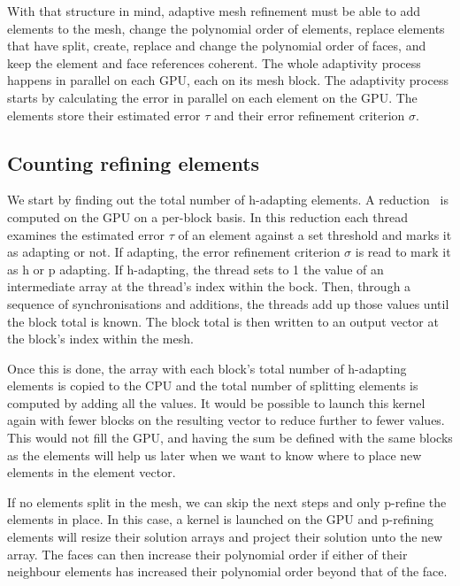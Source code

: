 With that structure in mind, adaptive mesh refinement must be able to add elements to the mesh,
change the polynomial order of elements, replace elements that have split, create, replace and
change the polynomial order of faces, and keep the element and face references coherent. The whole
adaptivity process happens in parallel on each GPU, each on its mesh block. The adaptivity process
starts by calculating the error in parallel on each element on the GPU. The elements store their
estimated error $\tau$ and their error refinement criterion $\sigma$.

\subsection{Counting refining elements} \label{subsection:adaptive_mesh_refinement:implementation:counting_refining_elements}


We start by finding out the total number of h-adapting elements. A reduction~\cite{Harris2007} is
computed on the GPU on a per-block basis. In this reduction each thread examines the estimated error
$\tau$ of an element against a set threshold and marks it as adapting or not. If adapting, the error
refinement criterion $\sigma$ is read to mark it as h or p adapting. If h-adapting, the thread sets
to 1 the value of an intermediate array at the thread's index within the bock. Then, through a
sequence of synchronisations and additions, the threads add up those values until the block total is
known. The block total is then written to an output vector at the block's index within the mesh.

Once this is done, the array with each block's total number of h-adapting elements is copied to the
CPU and the total number of splitting elements is computed by adding all the values. It would be
possible to launch this kernel again with fewer blocks on the resulting vector to reduce further to
fewer values. This would not fill the GPU, and having the sum be defined with the same blocks as the
elements will help us later when we want to know where to place new elements in the element vector.

If no elements split in the mesh, we can skip the next steps and only p-refine the elements in
place. In this case, a kernel is launched on the GPU and p-refining elements will resize their
solution arrays and project their solution unto the new array. The faces can then increase their
polynomial order if either of their neighbour elements has increased their polynomial order beyond
that of the face. 

